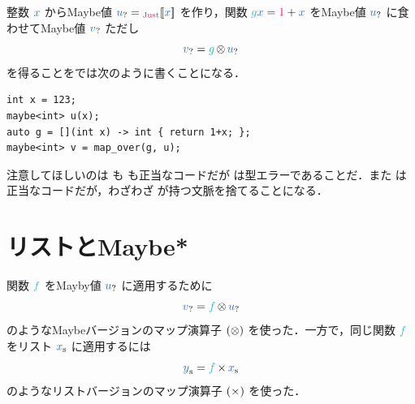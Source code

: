 \documentclass[a5paper,twoside,fleqn,draft]{jsbook}
\begin{document}
整数 $\hVar{x}$ からMaybe値 $\hMaybeVar{u}=\hJustWith{\hVar{x}}$ を作り，関数 $\hFunc{g}\hVar{x}=\hConstant{1}+\hVar{x}$ をMaybe値 $\hMaybeVar{u}$ に食わせてMaybe値 $\hMaybeVar{v}$ ただし
\begin{equation}
  \hMaybeVar{v}
  =\hFunc{g}\hFunctorMap\hMaybeVar{u}
\end{equation}
を得ることを\cxx では次のように書くことになる．
\begin{cxxcode}
\begin{verbatim}
int x = 123;
maybe<int> u(x);
auto g = [](int x) -> int { return 1+x; };
maybe<int> v = map_over(g, u);
\end{verbatim}
\end{cxxcode}
注意してほしいのは  も  も正当なコードだが  は型エラーであることだ．また  は正当なコードだが，わざわざ  が持つ文脈を捨てることになる．


\section{リストとMaybe*}

関数 $\hFunc{f}$ をMayby値 $\hMaybeVar{u}$ に適用するために
\begin{equation}
  \hMaybeVar{v}
  =\hFunc{f}\hFunctorMap\hMaybeVar{u}
\end{equation}
のようなMaybeバージョンのマップ演算子 $(\operatorname{\otimes})$ を使った．一方で，同じ関数 $\hFunc{f}$ をリスト $\hListVar{x}$ に適用するには
\begin{equation}
  \hListVar{y}
  =\hFunc{f}\hMap\hListVar{x}
\end{equation}
のようなリストバージョンのマップ演算子 $(\operatorname{\times})$ を使った．
\end{document}
